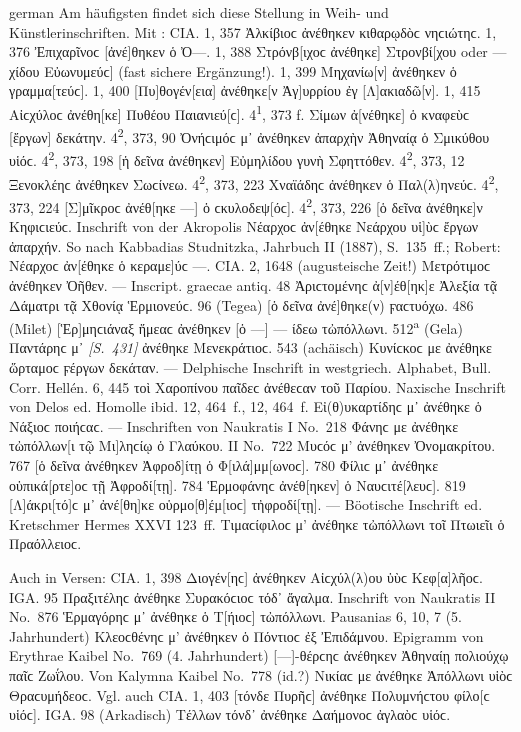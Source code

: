 \begin{otherlanguage*}{german}
Am häufigsten findet sich diese Stellung in Weih- und Künstlerinschriften. Mit : CIA. 1, 357 Ἀλκίβιοϲ ἀνέθηκεν κιθαρῳδὸϲ νηϲιώτηϲ. 1, 376 Ἐπιχαρῖνοϲ [ἀνέ]θηκεν ὁ Ὀ—. 1, 388 Στρόνβ[ιχοϲ ἀνέθηκε] Στρονβί[χου oder — χίδου Εὐ\-ω\-νυ\-μεύϲ] (fast sichere Ergänzung!). 1, 399 Μηχανίω[ν] ἀνέθηκεν ὁ γραμμα[τεύϲ]. 1, 400 [Πυ]θογέν[εια] ἀνέθηκε[ν Ἀγ]υρρίου ἐγ [Λ]ακιαδῶ[ν]. 1, 415 Αἰϲχύλοϲ ἀνέθη[κε] Πυθέου Παιανιεύ[ϲ]. 4\textsuperscript{1}, 373 f. Σίμων ἀ[νέθηκε] ὁ κναφεὺϲ [ἔργων] δεκάτην. 4\textsuperscript{2}, 373, 90 Ὀνήϲιμόϲ μ᾽ ἀνέθηκεν ἀπαρχὴν Ἀθηναίᾳ ὁ Σμικύθου υἱόϲ. 4\textsuperscript{2}, 373, 198 [ἡ δεῖνα ἀνέθηκεν] Εὐμηλίδου γυνὴ Σφηττόθεν. 4\textsuperscript{2}, 373, 12 Ξενοκλέηϲ ἀνέθηκεν Σωϲίνεω. 4\textsuperscript{2}, 373, 223 Χναϊάδηϲ ἀνέθηκεν ὁ Παλ(λ)ηνεύϲ. 4\textsuperscript{2}, 373, 224 [Σ]μῖκροϲ ἀνέθ[ηκε —] ὁ ϲκυλοδεψ[όϲ]. 4\textsuperscript{2}, 373, 226 [ὁ δεῖνα ἀνέθηκε]ν Κηφιϲιεύϲ. Inschrift von der Akropolis Νέαρχοϲ ἀν[έθηκε Νεάρχου υἱ]ὺϲ ἔργων ἀπαρχήν. So nach Kabbadias Studnitzka, Jahrbuch II (1887), S.~135~ff.; Robert: Νέαρχοϲ ἀν[έθηκε ὁ κεραμε]ύϲ —. CIA. 2, 1648 (augusteische Zeit!) Μετρότιμοϲ ἀνέθηκεν Ὀῆθεν. — Inscript. graecae antiq. 48 Ἀριϲτομένηϲ ἀ[ν]έθ[ηκ]ε Ἀλεξία τᾷ Δάματρι τᾷ Χθονίᾳ Ἑρμιονεύϲ. 96 (Tegea) [ὁ δεῖνα ἀνέ]θηκε(ν) ϝαϲτυόχω. 486 (Milet) [Ἑρ]μηϲιάναξ ἥμεαϲ ἀνέθηκεν [ὁ —] — ίδεω τὠπόλλωνι. 512\textsuperscript{a} (Gela) Παντάρηϲ μ᾽ \hypertarget{p431}{\emph{[S.~431]}}\label{p431} ἀνέθηκε Μενεκράτιοϲ. 543 (achäisch) Κυνίϲκοϲ με ἀνέθηκε ὥρταμοϲ ϝέργων δεκάταν. — Delphische Inschrift in westgriech. Alphabet, Bull. Corr. Hellén. 6, 445 τοὶ Χαροπίνου παῖδεϲ ἀνέθεϲαν τοῦ Παρίου. Naxische Inschrift von Delos ed. Homolle ibid. 12, 464~f., 12, 464~f. Εἰ(θ)υκαρτίδηϲ μ᾽ ἀνέθηκε ὁ Νάξιοϲ ποιήϲαϲ. — Inschriften von Naukratis I No.~218 Φάνηϲ με ἀνέθηκε τὠπόλλων[ι τῷ Μι]ληϲίῳ ὁ Γλαύκου. II No.~722 Μυϲόϲ μ’ ἀνέθηκεν Ὀνομακρίτου. 767 [ὁ δεῖνα ἀνέθηκεν Ἀφροδ]ίτῃ ὁ Φ[ιλά]μμ[ωνοϲ]. 780 Φίλιϲ μ᾽ ἀνέθηκε οὑπικά[ρτε]οϲ τῇ Ἀφροδί[τῃ]. 784 Ἑρμοφάνηϲ ἀνέθ[ηκεν] ὁ Ναυ\-ϲι\-τέ[\-λευϲ]. 819 [Λ]άκρι[τό]ϲ μ᾽ ἀνέ[θη]κε οὑρμο[θ]έμ[ιοϲ] τἠφροδί[τῃ]. — Böotische Inschrift ed. Kretschmer Hermes XXVI 123~ff. Τιμαϲίφιλοϲ μ’ ἀνέθηκε τὠπόλλωνι τοῖ Πτωιεῖι ὁ Πραόλλειοϲ.

Auch in Versen: CIA. 1, 398 Διογέν[ηϲ] ἀνέθηκεν Αἰϲχύλ(λ)ου ὑὺϲ Κεφ[α]λῆοϲ. IGA. 95 Πραξιτέληϲ ἀνέθηκε Συρακόϲιοϲ τόδ᾽ ἄγαλμα. Inschrift von Naukratis II No.~876 Ἑρμαγόρηϲ μ᾽ ἀνέθηκε ὁ Τ[ήιοϲ] τὠπόλλωνι. Pausanias 6, 10, 7 (5. Jahrhundert) Κλεοϲθένηϲ μ’ ἀνέθηκεν ὁ Πόντιοϲ ἐξ Ἐπιδάμνου. Epigramm von Erythrae Kaibel No.~769 (4. Jahrhundert) [—]-θέρϲηϲ ἀνέθηκεν Ἀθηναίῃ πολιούχῳ παῖϲ Ζωΐλου. Von Kalymna Kaibel No.~778 (id.?) Νικίαϲ με ἀνέθηκε Ἀπόλλωνι υἱὸϲ Θραϲυμήδεοϲ. Vgl. auch CIA. 1, 403 [τόνδε Πυρῆϲ] ἀνέθηκε Πολυμνήϲτου φίλο[ϲ υἱόϲ]. IGA. 98 (Arkadisch) Τέλλων τόνδ᾽ ἀνέθηκε Δαήμονοϲ ἀγλαὸϲ υἱόϲ.


\end{otherlanguage*}
